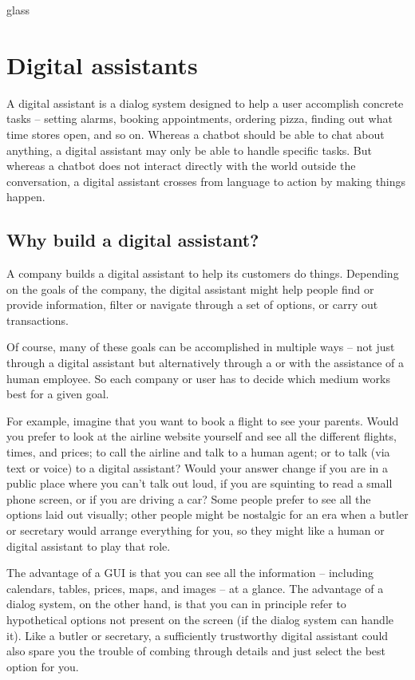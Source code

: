 \begin{underthehood}
\begin{tblsfilledsymbol}{}{glass}
\end{tblsfilledsymbol}
\end{underthehood}


\section{Digital assistants}

A digital assistant is a dialog system designed to help a user accomplish concrete tasks -- setting alarms, booking appointments, ordering pizza, finding out what time stores open, and so on.  Whereas a chatbot should be able to chat about anything, a digital assistant may only be able to handle specific tasks.  But whereas a chatbot does not interact directly with the world outside the conversation, a digital assistant crosses from language to action by making things happen.


\subsection{Why build a digital assistant?}

A company builds a digital assistant to help its customers do things.  Depending on the goals of the company, the digital assistant might help people find or provide information, filter or navigate through a set of options, or carry out transactions.

Of course, many of these goals can be accomplished in multiple ways -- not just through a digital assistant but alternatively through a  or with the assistance of a human employee.  So each company or user has to decide which medium works best for a given goal.

For example, imagine that you want to book a flight to see your parents.  Would you prefer to look at the airline website yourself and see all the different flights, times, and prices; to call the airline and talk to a human agent; or to talk (via text or voice) to a digital assistant?   Would your answer change if you are in a public place where you can't talk out loud, if you are squinting to read a small phone screen, or if you are driving a car?  Some people prefer to see all the options laid out visually; other people might be nostalgic for an era when a butler or secretary would arrange everything for you, so they might like a human or digital assistant to play that role.

The advantage of a GUI is that you can see all the information -- including calendars, tables, prices, maps,  and images -- at a glance.  The advantage of a dialog system, on the other hand, is that you can in principle refer to hypothetical options not present on the screen (if the dialog system can handle it).  Like a butler or secretary, a sufficiently trustworthy digital assistant could also spare you the trouble of combing through details and just select the best option for you. %


